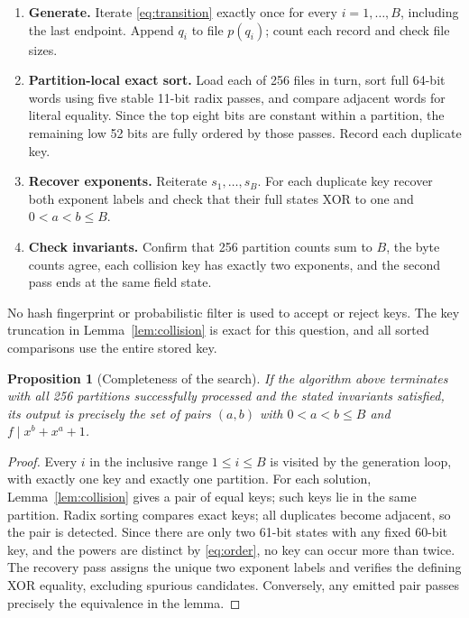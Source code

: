 \documentclass[11pt,a4paper]{article}
\newtheorem{proposition}[theorem]{Proposition}
\begin{document}
\begin{enumerate}[leftmargin=2em,itemsep=4pt]
\item \textbf{Generate.} Iterate \eqref{eq:transition} exactly once for
every \(i=1,\ldots,B\), including the last endpoint. Append \(q_i\)
to file \(p(q_i)\); count each record and check file sizes.
\item \textbf{Partition-local exact sort.} Load each of 256 files in
turn, sort full 64-bit words using five stable 11-bit radix passes,
and compare adjacent words for literal equality. Since the top eight
bits are constant within a partition, the remaining low 52 bits are
fully ordered by those passes. Record each duplicate key.
\item \textbf{Recover exponents.} Reiterate \(s_1,\ldots,s_B\). For
each duplicate key recover both exponent labels and check that their
full states XOR to one and \(0<a<b\le B\).
\item \textbf{Check invariants.} Confirm that 256 partition counts sum
to \(B\), the byte counts agree, each collision key has exactly two
exponents, and the second pass ends at the same field state.
\end{enumerate}
No hash fingerprint or probabilistic filter is used to accept or reject
keys. The key truncation in Lemma~\ref{lem:collision} is exact for this
question, and all sorted comparisons use the entire stored key.

\begin{proposition}[Completeness of the search]\label{prop:complete}
If the algorithm above terminates with all 256 partitions successfully
processed and the stated invariants satisfied, its output is precisely
the set of pairs \((a,b)\) with \(0<a<b\le B\) and
\(f\mid x^b+x^a+1\).
\end{proposition}
\begin{proof}
Every \(i\) in the inclusive range \(1\le i\le B\) is visited by
the generation loop, with exactly one key and exactly one partition.
For each solution, Lemma~\ref{lem:collision} gives a pair of equal keys;
such keys lie in the same partition. Radix sorting compares exact keys;
all duplicates become adjacent, so the pair is detected. Since there
are only two 61-bit states with any fixed 60-bit key, and the powers
are distinct by \eqref{eq:order}, no key can occur more than twice.
The recovery pass assigns the unique two exponent labels and verifies
the defining XOR equality, excluding spurious candidates. Conversely,
any emitted pair passes precisely the equivalence in the lemma.
\end{proof}
\end{document}
